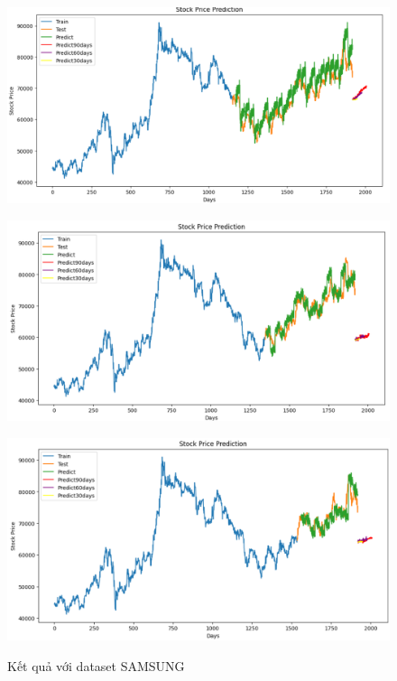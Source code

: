 \documentclass[conference]{IEEEtran}
\begin{document}
\begin{figure}[H]
    \centering
    \begin{minipage}{0.15\textwidth}
    \centering
    \includegraphics[width=1\textwidth]{Image/NBeat/N_BEAT_SAMSUNG_6_4.png}
   
    \label{fig:1}
    \end{minipage}%
    \begin{minipage}{0.15\textwidth}
    \centering
    \includegraphics[width=1\textwidth]{Image/NBeat/N_BEAT_SAMSUNG_7_3.png}
  
    \label{fig:2}
    \end{minipage}%
    \begin{minipage}{0.15\textwidth}
    \centering
    \includegraphics[width=1\textwidth]{Image/NBeat/N_BEAT_SAMSUNG_8_2.png}

    \label{fig:3}
    \end{minipage}
    \caption{Kết quả với dataset SAMSUNG}
\end{figure}
\end{document}
